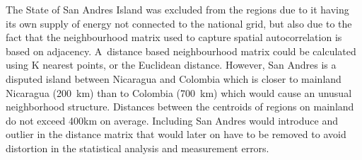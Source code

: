 \documentclass[energies,article,accept,pdftex,moreauthors]{Definitions/mdpi}
\begin{document}

The State of San Andres Island was excluded from the regions due to it having its own supply of energy not connected to the national grid, but also due to the fact that the neighbourhood matrix used to capture spatial autocorrelation is based on adjacency. A~distance based neighbourhood matrix could be calculated using K nearest points, or the Euclidean distance. However, San Andres is a disputed island between Nicaragua and Colombia which is closer to mainland Nicaragua (200~km) than to Colombia (700~km) which would cause an unusual neighborhood structure. Distances between the centroids of regions on mainland do not exceed 400km on average. Including San Andres would introduce and outlier in the distance matrix that would later on have to be removed to avoid distortion in the statistical analysis and measurement errors. \clearpage

\end{document}
